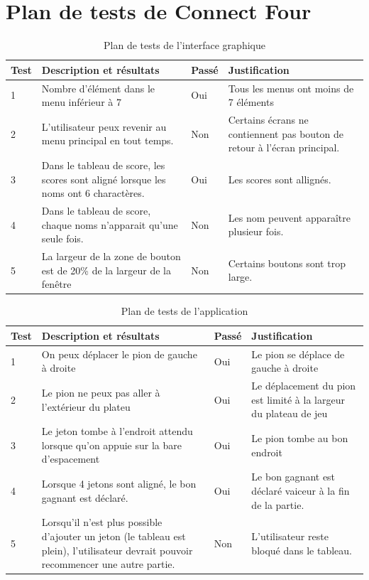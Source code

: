 \section{Plan de tests de Connect Four}

\begin{table}[H]
    \centering
    \caption{Plan de tests de l'interface graphique}
    \begin{tabular}{p{0.25in}p{2.5in}p{0.5in}p{2.5in}}
        \hline
        \bfseries Test & \bfseries Description et résultats & \bfseries Passé & \bfseries Justification \\
        \hline\hline
        1 & Nombre d'élément dans le menu inférieur à 7 & Oui & Tous les menus ont moins de 7 éléments \\
        2 & L'utilisateur peux revenir au menu principal en tout temps. & Non & Certains écrans ne contiennent pas bouton de retour à l'écran principal.\\
        3 & Dans le tableau de score, les scores sont aligné lorsque les noms ont 6 charactères. & Oui & Les scores sont allignés.\\
        4 & Dans le tableau de score, chaque noms n'apparait qu'une seule fois. & Non & Les nom peuvent apparaître plusieur fois.\\
        5 & La largeur de la zone de bouton est de 20\% de la largeur de la fenêtre & Non & Certains boutons sont trop large.\\
        \hline
    \end{tabular}
\end{table}

\begin{table}[H]
    \centering
    \caption{Plan de tests de l'application}
    \begin{tabular}{p{0.25in}p{2.5in}p{0.5in}p{2.5in}}
        \hline
        \bfseries Test & \bfseries Description et résultats & \bfseries Passé & \bfseries Justification \\
        \hline\hline
        1 & On peux déplacer le pion de gauche à droite & Oui & Le pion se déplace de gauche à droite \\
        2 & Le pion ne peux pas aller à l'extérieur du plateu & Oui & Le déplacement du pion est limité à la largeur du plateau de jeu \\
        3 & Le jeton tombe à l'endroit attendu lorsque qu'on appuie sur la bare d'espacement & Oui & Le pion tombe au bon endroit \\
        4 & Lorsque 4 jetons sont aligné, le bon gagnant est déclaré. & Oui & Le bon gagnant est déclaré vaiceur à la fin de la partie.\\
        5 & Lorsqu'il n'est plus possible d'ajouter un jeton (le tableau est plein), l'utilisateur devrait pouvoir recommencer une autre partie.& Non & L'utilisateur reste bloqué dans le tableau.\\
        \hline
    \end{tabular}
\end{table}
